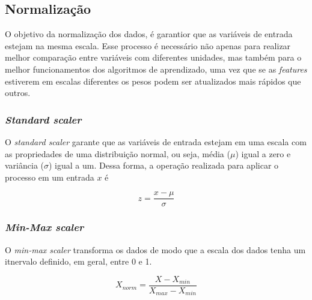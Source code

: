 \subsection{Normalização}
\label{sec:scaler}

O objetivo da normalização dos dados, é garantior que as variáveis de entrada 
estejam na mesma escala. Esse processo é necessário não apenas para realizar melhor comparação entre variáveis 
com diferentes unidades, mas também para o melhor funcionamentos dos algoritmos 
de aprendizado, uma vez que se as \textit{features} estiverem em escalas diferentes
os pesos podem ser atualizados mais rápidos que outros.

\subsubsection{\textit{Standard scaler}}

O \textit{standard scaler} garante que as variáveis de entrada estejam em uma 
escala com as propriedades de uma distribuição normal, ou seja, média ($\mu$)
igual a zero e variância ($\sigma$) igual a um. Dessa forma, a operação 
realizada para aplicar o processo em um entrada $x$ é

\begin{equation}
  z = \frac{x - \mu}{\sigma}
\end{equation}

\subsubsection{\textit{Min-Max scaler}}

O \textit{min-max scaler} transforma os dados de modo que a 
escala dos dados tenha um itnervalo definido, em geral, entre
0 e 1.

\begin{equation}
  X_{norm} = \frac{X - X_{min}}{X_{max} - X_{min}}
\end{equation}